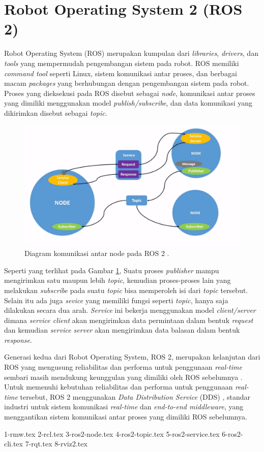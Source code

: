 \section{Robot Operating System 2 (ROS 2)}
\label{sec:ros2}

Robot Operating System (ROS) \citep{cit:quigley2009} merupakan kumpulan dari \emph{libraries}, \emph{drivers}, dan \emph{tools} yang mempermudah pengembangan sistem pada robot.
ROS memiliki \emph{command tool} seperti Linux, sistem komunikasi antar proses, dan berbagai macam \emph{packages} yang berhubungan dengan pengembangan sistem pada robot.
Proses yang dieksekusi pada ROS disebut sebagai \emph{node}, komunikasi antar proses yang dimiliki menggunakan model \emph{publish/subscribe}, dan data komunikasi yang dikirimkan disebut sebagai \emph{topic}.

\begin{figure} [ht]
  \centering
	\includegraphics[scale=0.4]{gambar/komunikasi-ros.png}
	\caption{Diagram komunikasi antar node pada ROS 2 \citep{url:ros2nodes}.}
	\label{fig:komunikasiros}
\end{figure}

Seperti yang terlihat pada Gambar \ref{fig:komunikasiros}, Suatu proses \emph{publisher} mampu mengirimkan satu maupun lebih \emph{topic}, kemudian proses-proses lain yang melakukan \emph{subscribe} pada suatu \emph{topic} bisa memperoleh isi dari \emph{topic} tersebut.
Selain itu ada juga \emph{sevice} yang memiliki fungsi seperti \emph{topic}, hanya saja dilakukan secara dua arah.
\emph{Service} ini bekerja menggunakan model \emph{client/server} dimana \emph{service client} akan mengirimkan data permintaan dalam bentuk \emph{request} dan kemudian \emph{service server} akan mengirimkan data balasan dalam bentuk \emph{response}.

Generasi kedua dari Robot Operating System, ROS 2, merupakan kelanjutan dari ROS yang mengusung reliabilitas dan performa untuk penggunaan \emph{real-time} sembari masih mendukung keunggulan yang dimiliki oleh ROS sebelumnya \citep{cit:maruyama2016}.
Untuk memenuhi kebutuhan reliabilitas dan performa untuk penggunaan \emph{real-time} tersebut, ROS 2 menggunakan \emph{Data Distribution Service} (DDS) \citep{cit:castellote2003} \citep{cit:schlesselman2004}, standar industri untuk sistem komunikasi \emph{real-time} dan \emph{end-to-end middleware}, yang menggantikan sistem komunikasi antar proses yang dimiliki ROS sebelumnya.

{1-rmw.tex}
{2-rcl.tex}
{3-ros2-node.tex}
{4-ros2-topic.tex}
{5-ros2-service.tex}
{6-ros2-cli.tex}
{7-rqt.tex}
{8-rviz2.tex}

